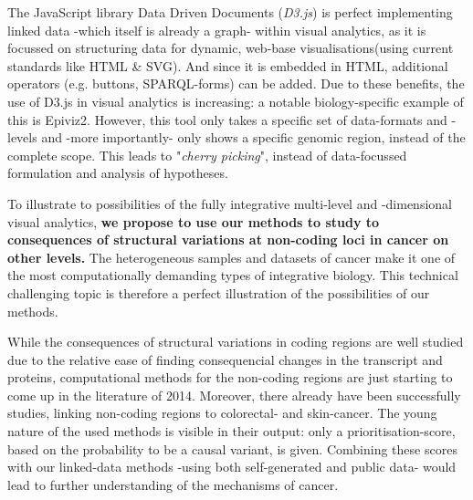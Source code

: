 \documentclass[twoside,fontsize=10pt]{article}
\begin{document}
The JavaScript library Data Driven Documents (\textit{D3.js}) is perfect implementing linked data -which itself is already a graph- within visual analytics, as it is focussed on structuring data for dynamic, web-base visualisations(using current standards like HTML \& SVG)\cite{Bostock2011}. And since it is embedded in HTML, additional operators (e.g. buttons, SPARQL-forms) can be added. Due to these benefits, the use of D3.js in visual analytics is increasing: a notable biology-specific example of this is Epiviz2\cite{Chelaru2014}. However, this tool only takes a specific set of data-formats and -levels and -more importantly- only shows a specific genomic region, instead of the complete scope. This leads to "\textit{cherry picking}", instead of data-focussed formulation and analysis of hypotheses.
\medskip

\noindent
To illustrate to possibilities of the fully integrative multi-level and -dimensional visual analytics,\textbf{ we propose to use our methods to study to consequences of structural variations at non-coding loci in cancer on other levels.} The heterogeneous samples and datasets of cancer make it one of the most computationally demanding types of integrative biology. This technical challenging topic is therefore a perfect illustration of the possibilities of our methods.

While the consequences of structural variations in coding regions are well studied due to the relative ease of finding consequencial changes in the transcript and proteins\cite{McLaren2010}, computational methods for the non-coding regions are just starting to come up in the literature of 2014\cite{Khurana2013,Kircher2014}. Moreover, there already have been successfully studies, linking non-coding regions to colorectal- and skin-cancer\cite{Ongen2014,Huang2013}. The young nature of the used methods is visible in their output: only a prioritisation-score, based on the probability to be a causal variant, is given. Combining these scores with our linked-data methods -using both self-generated and public data- would lead to further understanding of the mechanisms of cancer. 


%

\end{document}
